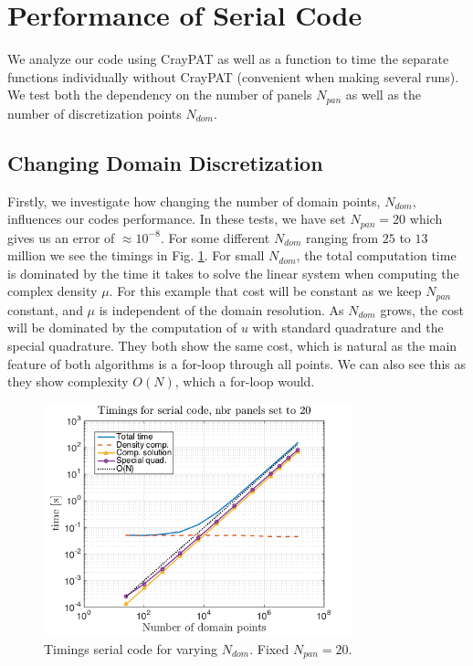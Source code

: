 \documentclass[a4paper,10pt]{article}
\begin{document}
\FloatBarrier

\section*{Performance of Serial Code}
We analyze our code using CrayPAT as well as a function to time the separate functions individually without CrayPAT (convenient when making several runs). We test both the dependency on the number of panels $N_{pan}$ as well as the number of discretization points $N_{dom}$.

\subsection*{Changing Domain Discretization}
Firstly, we investigate how changing the number of domain points, $N_{dom}$, influences our codes performance. In these tests, we have set $N_{pan}=20$ which gives us an error of $\approx 10^{-8}$. For some different $N_{dom}$ ranging from $25$ to $13$ million we see the timings in Fig. \ref{fig:serial1}. For small $N_{dom}$, the total computation time is dominated by the time it takes to solve the linear system when computing the complex density $\mu$. For this example that cost will be constant as we keep $N_{pan}$ constant, and $\mu$ is independent of the domain resolution. As $N_{dom}$ grows, the cost will be dominated by the computation of $u$ with standard quadrature and the special quadrature. They both show the same cost, which is natural as the main feature of both algorithms is a for-loop through all points. We can also see this as they show complexity $O(N)$, which a for-loop would. 
\begin{figure}[ht]
    \begin{center}
        \includegraphics[width=0.8\textwidth]{Graphics/timing_serial_npanels20.png}
    \end{center}
    \caption{Timings serial code for varying $N_{dom}$. Fixed $N_{pan}=20$.}
    \label{fig:serial1}
\end{figure}
\end{document}
